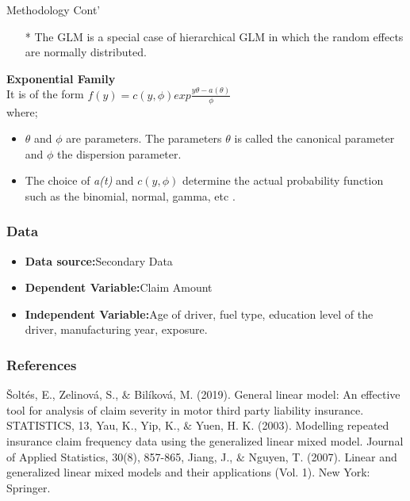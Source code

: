 \documentclass[11pt]{beamer}
\begin{document}
\begin{frame}
	\begin{block}{Methodology Cont'}
		\begin{itemize}
		\item[*] The GLM is a special case of hierarchical GLM in which the random effects are normally distributed.
	\end{itemize}
\textbf{Exponential Family}\\

It is of the form 
$f(y) = c(y,\phi)exp{\frac{y\theta - a(\theta)}{\phi}}$\\
where;\\
\begin{itemize}
	\item  $\theta$ and $\phi$ are parameters. The parameters $\theta$ is called the canonical parameter and  $\phi$ the dispersion parameter.  \\
\item   The choice of \emph{a(t)} and $c(y,\phi)$ determine the actual probability function such as the binomial, normal, gamma, etc .\\ 
\end{itemize}
	\end{block}
\end{frame}
\begin{frame}
	\frametitle{Data}
	\begin{itemize}
		\item \textbf{Data source:}Secondary Data\\
		\item \textbf{Dependent Variable:}Claim Amount\\
		\item \textbf{Independent Variable:}Age of driver, fuel type, education level of the driver, manufacturing year, exposure.\\
		
	\end{itemize}
\end{frame}

\begin{frame}
	\frametitle{References}
	\begin{thebibliography}{9}
		Šoltés, E., Zelinová, S., $\&$ Bilíková, M. (2019). General linear model: An effective tool for analysis of claim severity in motor third party liability insurance. STATISTICS, 13,
		Yau, K., Yip, K., $\&$ Yuen, H. K. (2003). Modelling repeated insurance claim frequency data using the generalized linear mixed model. Journal of Applied Statistics, 30(8), 857-865,	
		Jiang, J., $\&$ Nguyen, T. (2007). Linear and generalized linear mixed models and their applications (Vol. 1). New York: Springer.
	\end{thebibliography}
\end{frame}
\end{document}
